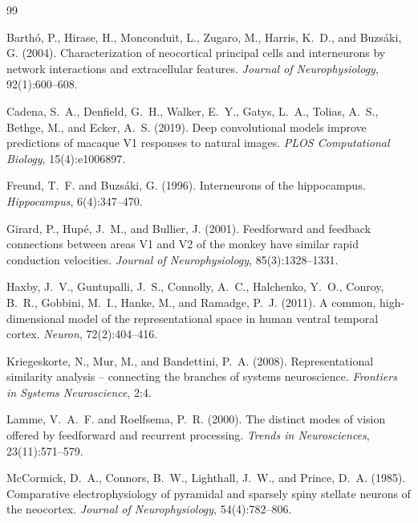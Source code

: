 \documentclass[11pt,onecolumn]{article}
\begin{document}
\newpage

\begin{thebibliography}{99}

Barth{\'o}, P., Hirase, H., Monconduit, L., Zugaro, M., Harris, K.~D.,
and Buzs{\'a}ki, G. (2004).
Characterization of neocortical principal cells and interneurons by
network interactions and extracellular features.
\textit{Journal of Neurophysiology}, 92(1):600--608.

Cadena, S.~A., Denfield, G.~H., Walker, E.~Y., Gatys, L.~A.,
Tolias, A.~S., Bethge, M., and Ecker, A.~S. (2019).
Deep convolutional models improve predictions of macaque V1 responses to
natural images.
\textit{PLOS Computational Biology}, 15(4):e1006897.

Freund, T.~F. and Buzs{\'a}ki, G. (1996).
Interneurons of the hippocampus.
\textit{Hippocampus}, 6(4):347--470.

Girard, P., Hup{\'e}, J.~M., and Bullier, J. (2001).
Feedforward and feedback connections between areas V1 and V2 of the
monkey have similar rapid conduction velocities.
\textit{Journal of Neurophysiology}, 85(3):1328--1331.

Haxby, J.~V., Guntupalli, J.~S., Connolly, A.~C., Halchenko, Y.~O.,
Conroy, B.~R., Gobbini, M.~I., Hanke, M., and Ramadge, P.~J. (2011).
A common, high-dimensional model of the representational space in human
ventral temporal cortex.
\textit{Neuron}, 72(2):404--416.

Kriegeskorte, N., Mur, M., and Bandettini, P.~A. (2008).
Representational similarity analysis -- connecting the branches of
systems neuroscience.
\textit{Frontiers in Systems Neuroscience}, 2:4.

Lamme, V.~A.~F. and Roelfsema, P.~R. (2000).
The distinct modes of vision offered by feedforward and recurrent
processing.
\textit{Trends in Neurosciences}, 23(11):571--579.

McCormick, D.~A., Connors, B.~W., Lighthall, J.~W., and Prince, D.~A.
(1985).
Comparative electrophysiology of pyramidal and sparsely spiny stellate
neurons of the neocortex.
\textit{Journal of Neurophysiology}, 54(4):782--806.


\end{thebibliography}
\end{document}
